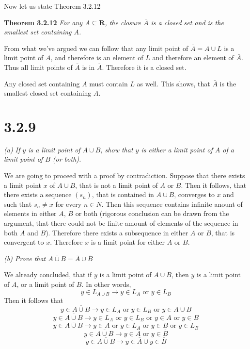 \documentclass[11pt,oneside,titlepage]{book}
\begin{document}
Now let us state Theorem 3.2.12

\textbf{Theorem 3.2.12} \textit{For any $A \subseteq \textbf{R}$, the closure
  $\bar{A}$ is a closed set and is the smallest set containing $A$.}

From what we've argued we can follow that any limit point of $\bar A = A \cup L$
is a limit point of $A$, and therefore is an element of $L$ and therefore an
element of $\bar{A}$.  Thus all limit points of $\bar A$ is in $\bar A$. Therefore
it is a closed set.

Any closed set containing $A$ must contain $L$ as well. This shows, that $\bar A$
is the smallest closed set containing $A$.

\section*{3.2.9}

\textit{(a) If $y$ is a limit point of $A \cup B$, show that $y$ is either a limit
  point of $A$ of a limit point of $B$ (or both).}


We are going to proceed with a proof by contradiction. Suppose that there exists a
limit point $x$ of $A \cup B$, that is not a limit point of $A$ or $B$. Then it
follows, that there exists a sequence $(s_n)$, that is contained in $A \cup B$,
converges to $x$ and such that $s_n \neq x$ for every $n \in N$. Then this
sequence contains infinite anount of elements in either $A$, $B$ or both
(rigorous conclusion can be drawn from the argument, that there could not
be finite amount of elements of the sequence in both $A$ and $B$).
Therefore there exists a subsequence in either $A$ or $B$, that is convergent to
$x$. Therefore $x$ is a limit point for either $A$ or $B$.

\textit{(b) Prove that $\overline{A \cup B} = \overline A \cup \overline B$}

We already concluded, that if $y$ is a limit point of $A \cup B$, then $y$ is a limit point
of $A$, or a limit point of $B$. In other words,
$$y \in L_{A\cup B} \to y \in L_A \text{ or } y \in L_B$$
Then it follows that
$$y \in \overline{A\cup B} \to y \in L_A \text{ or } y \in L_B \text{ or } y \in A \cup B$$
$$y \in \overline{A\cup B} \to y \in L_A \text{ or } y \in L_B \text{ or } y \in A
\text{ or } y \in B$$
$$y \in \overline{A\cup B} \to   y \in A \text{ or }  y \in L_A 
\text{ or } y \in B \text{ or }  y \in L_B$$
$$y \in \overline{A\cup B} \to   y \in \overline A
\text{ or } y \in \overline B $$
$$y \in \overline{A\cup B} \to   y \in \overline A
\cup y \in \overline B $$
\end{document}
